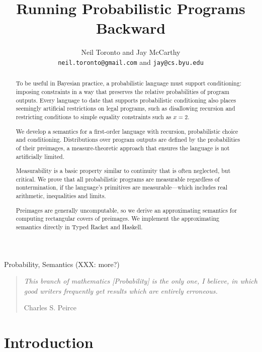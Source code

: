 \documentclass{llncs}
\title{Running Probabilistic Programs Backward}
\author{Neil Toronto and Jay McCarthy\\
\footnotesize{\texttt{neil.toronto@gmail.com} and \texttt{jay@cs.byu.edu}}}
\institute{PLT @ Brigham Young University, Provo, Utah, USA}
\date{}
\begin{document}
\maketitle

\begin{abstract}
To be useful in Bayesian practice, a probabilistic language must support conditioning: imposing constraints in a way that preserves the relative probabilities of program outputs.
Every language to date that supports probabilistic conditioning also places seemingly artificial restrictions on legal programs, such as disallowing recursion and restricting conditions to simple equality constraints such as $x = \mathrm{2}$.

We develop a semantics for a first-order language with recursion, probabilistic choice and conditioning.
Distributions over program outputs are defined by the probabilities of their preimages, a measure-theoretic approach that ensures the language is not artificially limited.

Measurability is a basic property similar to continuity that is often neglected, but critical.
We prove that all probabilistic programs are measurable regardless of nontermination, if the language's primitives are measurable---which includes real arithmetic, inequalities and limits.

Preimages are generally uncomputable, so we derive an approximating semantics for computing rectangular covers of preimages.
We implement the approximating semantics directly in Typed Racket and Haskell.
\end{abstract}

\keywords Probability, Semantics (XXX: more?)


\begin{quote}
\textit{This branch of mathematics [Probability] is the only one, I believe, in which good writers frequently get results which are entirely erroneous.}

\hfill Charles S. Peirce
\vspace{-\baselineskip}
\end{quote}


\section{Introduction}
\end{document}
